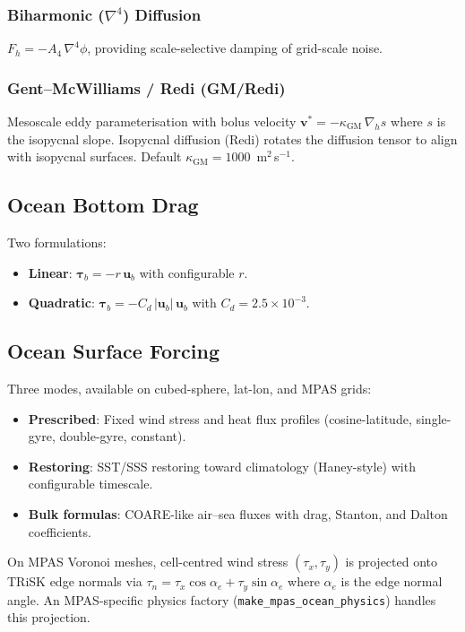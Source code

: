 \documentclass[11pt,a4paper]{article}
\begin{document}
\subsubsection{Biharmonic ($\nabla^4$) Diffusion}
$F_h = -A_4\,\nabla^4\phi$, providing scale-selective damping of grid-scale noise.

\subsubsection{Gent--McWilliams / Redi (GM/Redi)}
Mesoscale eddy parameterisation with bolus velocity $\bm v^*=-\kappa_{\mathrm{GM}}\,\nabla_h s$ where $s$ is the isopycnal slope.  Isopycnal diffusion (Redi) rotates the diffusion tensor to align with isopycnal surfaces.  Default $\kappa_{\mathrm{GM}}=1000$~m$^2$\,s$^{-1}$.

\subsection{Ocean Bottom Drag}

Two formulations:
\begin{itemize}[nosep]
  \item \textbf{Linear}: $\bm\tau_b=-r\,\bm u_b$ with configurable $r$.
  \item \textbf{Quadratic}: $\bm\tau_b=-C_d\,|\bm u_b|\,\bm u_b$ with $C_d=2.5\times10^{-3}$.
\end{itemize}

\subsection{Ocean Surface Forcing}

Three modes, available on cubed-sphere, lat-lon, and MPAS grids:
\begin{itemize}[nosep]
  \item \textbf{Prescribed}: Fixed wind stress and heat flux profiles (cosine-latitude, single-gyre, double-gyre, constant).
  \item \textbf{Restoring}: SST/SSS restoring toward climatology (Haney-style) with configurable timescale.
  \item \textbf{Bulk formulas}: COARE-like air--sea fluxes with drag, Stanton, and Dalton coefficients.
\end{itemize}
On MPAS Voronoi meshes, cell-centred wind stress $(\tau_x,\tau_y)$ is projected onto TRiSK edge normals via $\tau_n = \tau_x\cos\alpha_e + \tau_y\sin\alpha_e$ where $\alpha_e$ is the edge normal angle.  An MPAS-specific physics factory (\texttt{make\_mpas\_ocean\_physics}) handles this projection.
\end{document}

